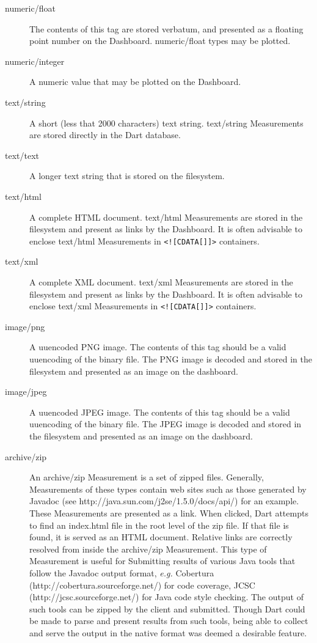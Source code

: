 \documentclass{InsightBook}
\newcommand{\xmltag}[1]{\texttt{<#1>}}
\begin{document}
\begin{description}
  \item[numeric/float]{The contents of this tag are stored verbatum,
and presented as a floating point number on the Dashboard.
numeric/float types may be plotted.}
  \item[numeric/integer]{A numeric value that may be plotted on the
Dashboard.}
  \item[text/string]{A short (less that 2000 characters) text string.
text/string Measurements are stored directly in the Dart database.}
  \item[text/text]{A longer text string that is stored on the
filesystem.}
  \item[text/html]{A complete HTML document.  text/html Measurements
are stored in the filesystem and present as links by the Dashboard.
It is often advisable to enclose text/html Measurements in
\xmltag{![CDATA[]]} containers.}
  \item[text/xml]{A complete XML document.  text/xml Measurements
are stored in the filesystem and present as links by the Dashboard. 
It is often advisable to enclose text/xml Measurements in
\xmltag{![CDATA[]]} containers.}
  \item[image/png]{A uuencoded PNG image.  The contents of this tag
should be a valid uuencoding of the binary file.  The PNG image is
decoded and stored in the filesystem and presented as an image on the dashboard.}
  \item[image/jpeg]{A uuencoded JPEG image.  The contents of this tag
should be a valid uuencoding of the binary file.  The JPEG image is
decoded and stored in the filesystem and presented as an image on the
dashboard.}
  \item[archive/zip]{An archive/zip Measurement is a set of zipped
files.  Generally, Measurements of these types contain web sites such
as those generated by Javadoc (see
http://java.sun.com/j2se/1.5.0/docs/api/) for an example.  These
Measurements are presented as a link.  When clicked, Dart attempts to
find an index.html file in the root level of the zip file.  If that
file is found, it is served as an HTML document.  Relative links are
correctly resolved from inside the archive/zip Measurement.  This type
of Measurement is useful for Submitting results of various Java tools
that follow the Javadoc output format, \emph{e.g.} Cobertura
(http://cobertura.sourceforge.net/) for code coverage, JCSC
(http://jcsc.sourceforge.net/) for Java code style checking.  The
output of such tools can be zipped by the client and submitted.
Though Dart could be made to parse and present results from such
tools, being able to collect and serve the output in the native format
was deemed a desirable feature.}
\end{description}
\end{document}
